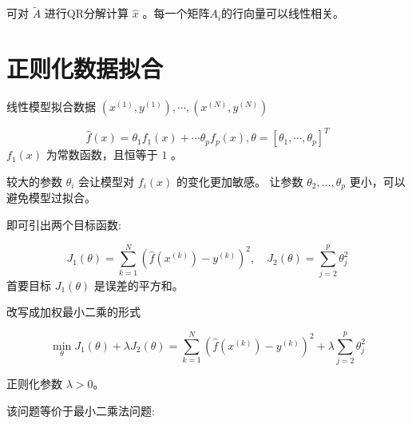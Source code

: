 可对 $ \tilde{A} $ 进行QR分解计算 $ \hat{x} $ 。每一个矩阵$A_i$的行向量可以线性相关。



\section{正则化数据拟合}

\begin{problem}
    线性模型拟合数据 $ \left(x^{(1)}, y^{(1)}\right), \cdots,\left(x^{(N)}, y^{(N)}\right) $

    $$
\hat{f}(x)=\theta_{1} f_{1}(x)+\cdots \theta_{p} f_{p}(x), \theta=\left[\theta_{1}, \cdots, \theta_{p}\right]^{T}
$$
$ f_{1}(x) $ 为常数函数，且恒等于 $1$ 。
\end{problem}


较大的参数 $ \theta_{i} $ 会让模型对 $ f_{i}(x) $ 的变化更加敏感。 让参数 $ \theta_{2}, \ldots, \theta_{p} $ 更小，可以避免模型过拟合。

即可引出两个目标函数:

\begin{problem}
    $$
J_{1}(\theta)=\sum_{k=1}^{N}\left(\hat{f}\left(x^{(k)}\right)-y^{(k)}\right)^{2}, \quad J_{2}(\theta)=\sum_{j=2}^{p} \theta_{j}^{2}
$$
首要目标 $ J_{1}(\theta) $ 是误差的平方和。
\end{problem}

改写成加权最小二乘的形式

\begin{problem}
    $$
\min _{\theta} J_{1}(\theta)+\lambda J_{2}(\theta)=\sum_{k=1}^{N}\left(\hat{f}\left(x^{(k)}\right)-y^{(k)}\right)^{2}+\lambda \sum_{j=2}^{p} \theta_{j}^{2}
$$

正则化参数 $ \lambda>0 $。
\end{problem}




该问题等价于最小二乘法问题:

